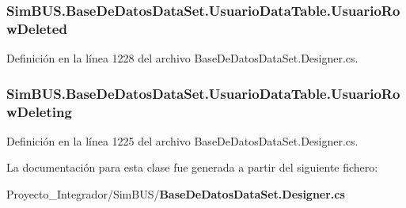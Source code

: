 \subsubsection[{Usuario\-Row\-Deleted}]{ Sim\-B\-U\-S.\-Base\-De\-Datos\-Data\-Set.\-Usuario\-Data\-Table.\-Usuario\-Row\-Deleted}\label{class_sim_b_u_s_1_1_base_de_datos_data_set_1_1_usuario_data_table_a20a08957f200bf64baa3c26d38fa7bd5}


Definición en la línea 1228 del archivo Base\-De\-Datos\-Data\-Set.\-Designer.\-cs.

\subsubsection[{Usuario\-Row\-Deleting}]{ Sim\-B\-U\-S.\-Base\-De\-Datos\-Data\-Set.\-Usuario\-Data\-Table.\-Usuario\-Row\-Deleting}\label{class_sim_b_u_s_1_1_base_de_datos_data_set_1_1_usuario_data_table_aeaca683010d58f06f7c37b27ba7f2414}


Definición en la línea 1225 del archivo Base\-De\-Datos\-Data\-Set.\-Designer.\-cs.



La documentación para esta clase fue generada a partir del siguiente fichero\-:\begin{DoxyCompactItemize}
\item 
Proyecto\-\_\-\-Integrador/\-Sim\-B\-U\-S/{\bf Base\-De\-Datos\-Data\-Set.\-Designer.\-cs}\end{DoxyCompactItemize}
